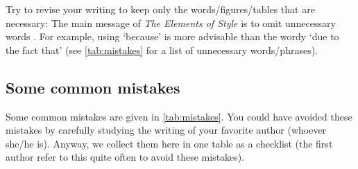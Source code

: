 \documentclass[authoryear,12pta4paper,fleqn]{article}
\numberwithin{equation}{section}
\theoremstyle{remark}
\begin{document}
Try to revise your writing to keep only the words/figures/tables that are necessary: The main message of \textit{The Elements of Style} is to omit unnecessary words \citep{white1972elements}. For example, using `because' is more advisable than the wordy `due to the fact that' (see \cref{tab:mistakes} for a list of unnecessary words/phrases).\\





% 
\subsection{Some common mistakes}\label{sec:mistakes}


Some common mistakes are given in \cref{tab:mistakes}. You could have avoided these mistakes by carefully studying the writing of your favorite author (whoever she/he is). Anyway, we collect them here in one table as a checklist (the first author refer to this quite often to avoid these mistakes).
\end{document}
